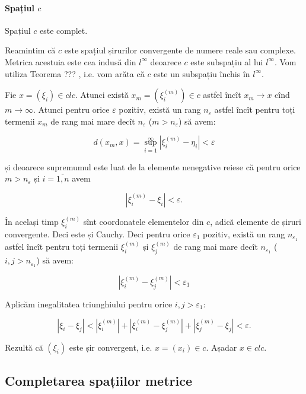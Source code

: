 \documentclass[a4paper,12pt]{article}
\theoremstyle{change}
\newenvironment{proof}{{\bf Demonstrație:} }{}
\begin{document}
\paragraph{Spațiul $c$} Spațiul $c$ este complet. 

\begin{proof}
Reamintim că $c$ este spațiul șirurilor convergente de numere reale sau complexe.
Metrica acestuia este cea indusă din $l^\infty$ deoarece $c$ este subspațiu al lui $l^\infty$.
Vom utiliza Teorema ??? , i.e. vom arăta că $c$ este un subspațiu închis în $l^\infty$.

Fie $x=(\xi_i)\in cl c$. Atunci există $x_m=(\xi_i^{(m)})\in c$ astfel încît $x_m\to x$ cînd $m\to\infty$. Atunci pentru orice $\varepsilon$ pozitiv, există un rang $n_{\varepsilon}$ astfel încît pentru toți termenii $x_m$ de rang mai mare decît $n_{\varepsilon}$ ($m>n_{\varepsilon}$) să avem:

\[
  d(x_m,x) = \sup_{i=1}^{\infty} |\xi_i^{(m)} - \eta_i| < \varepsilon
\]

și deoarece supremumul este luat de la elemente nenegative reiese că pentru orice $m>n_\varepsilon$ și $i=\overline{1,n}$ avem

\[
|\xi_i^{(m)} - \xi_i| < \varepsilon.
\]

În același timp $\xi_i^{(m)}$ sînt coordonatele elementelor din $c$, adică elemente de șiruri convergente. Deci este și Cauchy. Deci pentru orice $\varepsilon_1$ pozitiv, există un rang $n_{\varepsilon_1}$ astfel încît pentru toți termenii $\xi_i^{(m)}$ și $\xi_j^{(m)}$ de rang mai mare decît $n_{\varepsilon_1}$ ($i,j>n_{\varepsilon_1}$) să avem:

\[
|\xi_i^{(m)}-\xi_j^{(m)}|<\varepsilon_1
\]

Aplicăm inegalitatea triunghiului pentru orice $i,j>\varepsilon_1$:

\[
|\xi_i-\xi_j|<|\xi_i^{(m)}|+|\xi_i^{(m)}-\xi_j^{(m)}|+|\xi_j^{(m)}-\xi_j|<\varepsilon.
\]

Rezultă că $(\xi_i)$ este șir convergent, i.e. $x=(x_i)\in c$. Așadar $x\in cl c$.
\end{proof}





\subsection{Completarea spațiilor metrice}
\end{document}
